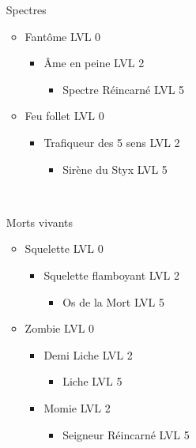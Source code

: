 \begin{itemize}
	\item[Spectres]~\\
		\begin{itemize}
			\item Fantôme LVL 0
				\begin{itemize}
					\item Âme en peine LVL 2
						\begin{itemize}
							\item Spectre Réincarné LVL 5
						\end{itemize}
				\end{itemize}
			\item Feu follet LVL 0
				\begin{itemize}
					\item Trafiqueur des 5 sens LVL 2
						\begin{itemize}
							\item Sirène du Styx LVL 5
						\end{itemize}
				\end{itemize}
		\end{itemize}~\\
	\item[Morts vivants] ~\\
		\begin{itemize}
			\item Squelette LVL 0
				\begin{itemize}
					\item Squelette flamboyant LVL 2
						\begin{itemize}
							\item Os de la Mort LVL 5
						\end{itemize}
				\end{itemize}
			\item Zombie LVL 0
				\begin{itemize}
					\item Demi Liche LVL 2
						\begin{itemize}
							\item Liche LVL 5
						\end{itemize}
					\item Momie LVL 2
						\begin{itemize}
							\item Seigneur Réincarné LVL 5
						\end{itemize}
				\end{itemize}
		\end{itemize}~\\

\end{itemize}
